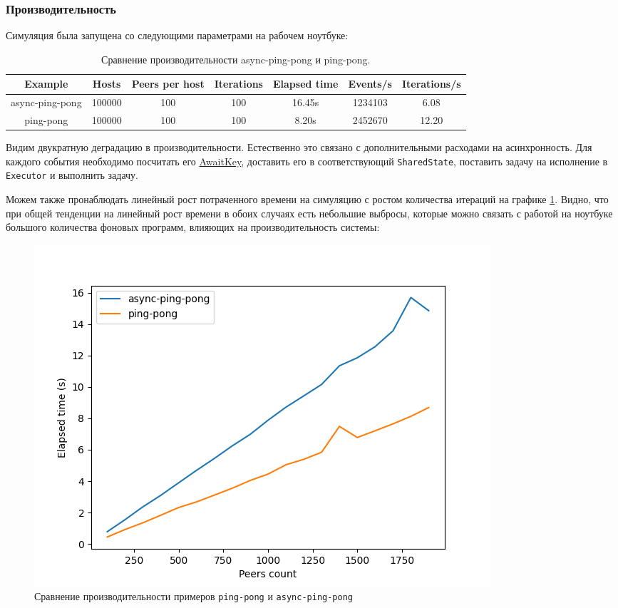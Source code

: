 \subsubsection{Производительность}

Симуляция была запущена со следующими параметрами на рабочем ноутбуке:
\begin{table}[H]
    \centering
    \begin{tabular}{|c|c|c|c|c|c|c|}
        \hline
        Example & Hosts & Peers per host & Iterations & Elapsed time & Events/s & Iterations/s \\
        \hline
        async-ping-pong & 100000 & 100 & 100 & 16.45s & 1234103 & 6.08\\
        \hline
        ping-pong & 100000 & 100 & 100 & 8.20s & 2452670 & 12.20\\
        \hline
    \end{tabular}
    \caption{Сравнение производительности async-ping-pong и ping-pong.}
    \label{cmp:ping-pong}
\end{table}

Видим двукратную деградацию в производительности. Естественно это связано с дополнительными расходами на асинхронность. Для каждого события необходимо посчитать его \hyperref[awaitkey]{AwaitKey}, доставить его в соответствующий \texttt{SharedState}, поставить задачу на исполнение в \texttt{Executor} и выполнить задачу.

Можем также пронаблюдать линейный рост потраченного времени на симуляцию с ростом количества итераций на графике \ref{async-perf}. Видно, что при общей тенденции на линейный рост времени в обоих случаях есть небольшие выбросы, которые можно связать с работой на ноутбуке большого количества фоновых программ, влияющих на производительность системы:
\begin{figure}[H]
    \centering
    \includegraphics[width=0.9\linewidth]{images/async-ping-pong.png}
    \caption{Сравнение производительности примеров \texttt{ping-pong} и \texttt{async-ping-pong}}
    \label{async-perf}
\end{figure}

